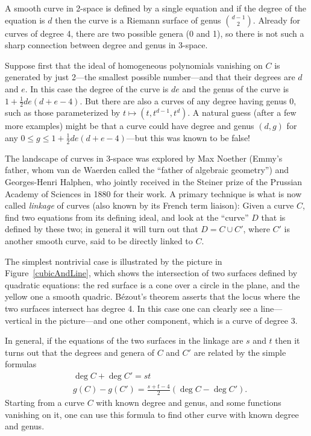\documentclass[11pt, oneside]{article}   	%
\begin{document}
A  smooth curve in 2-space is defined by a single equation and if the degree of the equation is $d$ then the curve is a Riemann surface of genus $d-1\choose 2$.
Already for curves of degree 4, there are two possible genera (0 and 1), so there is not such a 
sharp connection between degree and genus in 3-space.

Suppose first that the ideal of homogeneous polynomials vanishing on $C$ is generated by just 2---the smallest possible number---and that their degrees are $d$ and $e$. In this case the degree of the curve
is $de$ and the genus of the curve is $1+\frac{1}{2}de(d+e-4)$. But there are also a curves of any degree having genus 0, such as those parameterized by $t \mapsto (t, t^{d-1}, t^{d})$. A natural guess (after a few more examples) might be that a curve could have degree and genus $(d,g)$ for any
$0\leq g \leq 1+\frac{1}{2}de(d+e-4)$---but this was known to be false!

The landscape of curves in 3-space was explored by 
Max Noether (Emmy's father, whom van de Waerden called the ``father of algebraic geometry'') and Georges-Henri Halphen, who jointly received in the Steiner prize of the Prussian Academy of Sciences in 1880 for their work. A primary technique is what is now called \emph{linkage} of curves (also known by its French term liaison):  Given a curve $C$, find two equations from its defining ideal, and look at the ``curve'' $D$ that is defined by these two; in general it will turn out that $D = C\cup C'$, where $C'$ is another smooth curve, said to be directly linked to $C$.

The simplest nontrivial case is illustrated by the picture in
Figure~\ref{cubicAndLine}, which shows the intersection of two surfaces defined by quadratic equations: the red surface is a cone over a circle in the plane, and the yellow one a smooth quadric.
B\'ezout's theorem asserts that the locus where the two surfaces intersect has degree 4. In this case one can clearly see a line---vertical in the picture---and one other component, which is a curve of degree 3.

In general, if the equations of the two surfaces in the linkage are $s$ and $t$ then it turns out that
the degrees and genera of $C$ and $C'$ are related by the simple formulas
\begin{align*}
&\deg C+\deg C' = st\\
&g(C) - g({C'}) = \frac{s+t-4}{2}(\deg C-\deg {C'}).
\end{align*}
Starting from a  curve $C$ with known degree and genus, and some functions vanishing on it, one can use this formula to find other curve with known degree and genus. 
\end{document}
